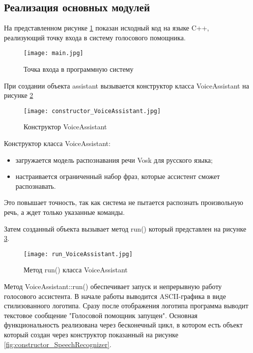 \subsection{Реализация основных модулей}

На представленном рисунке \ref{fig:main.cpp} показан исходный код на языке C++, реализующий точку входа в систему голосового помощника.
\begin{figure}[H]
	\centering
	\texttt{[image: main.jpg]}
	\caption{Точка входа в программную систему}
	\label{fig:main.cpp}
\end{figure}

При создании объекта assistant вызывается конструктор класса VoiceAssistant на рисунке \ref{fig:constructor_VoiceAssistant}

\begin{figure}[H]
	\centering
	\texttt{[image: constructor\_VoiceAssistant.jpg]}
	\caption{Конструктор VoiceAssistant}
	\label{fig:constructor_VoiceAssistant}
\end{figure}

Конструктор класса VoiceAssistant:
\begin{itemize}
 	\item загружается модель распознавания речи Vosk для русского языка;
	\item настраивается ограниченный набор фраз, которые ассистент сможет распознавать.
\end{itemize}

Это повышает точность, так как система не пытается распознать произвольную речь, а ждет только указанные команды.

Затем созданный объекта вызывает метод run() который представлен на рисунке \ref{fig:run_VoiceAssistant}.

\begin{figure}[H]
	\centering
	\texttt{[image: run\_VoiceAssistant.jpg]}
	\caption{Метод run() класса VoiceAssistant}
	\label{fig:run_VoiceAssistant}
\end{figure}

Метод VoiceAssistant::run() обеспечивает запуск и непрерывную работу голосового ассистента. В начале работы выводится ASCII-графика в виде стилизованного логотипа. Сразу после отображения логотипа программа выводит текстовое сообщение "Голосовой помощник запущен". Основная функциональность реализована через бесконечный цикл, в котором есть объект который создан через конструктор показанный на рисунке \ref{fig:constructor_SpeechRecognizer}.

